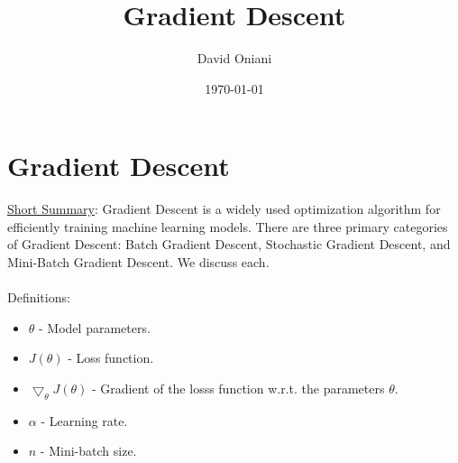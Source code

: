 \documentclass[11pt]{article}
\author{David Oniani}
\title{Gradient Descent}
\date{\today}
\begin{document}


\section*{\centering Gradient Descent}

\underline{Short Summary}: Gradient Descent is a widely used optimization algorithm for efficiently
training machine learning models. There are three primary categories of Gradient Descent: Batch
Gradient Descent, Stochastic Gradient Descent, and Mini-Batch Gradient Descent. We discuss each.
\\
\\
Definitions:

\begin{itemize}
    \item \(\theta\) - Model parameters.
    \item \(J(\theta)\) - Loss function.
    \item \(\bigtriangledown_\theta J(\theta)\) - Gradient of the losss function w.r.t. the
        parameters \(\theta\).
    \item \(\alpha\) - Learning rate.
    \item \(n\) - Mini-batch size.
\end{itemize}

\vspace{0.5em}
\end{document}
